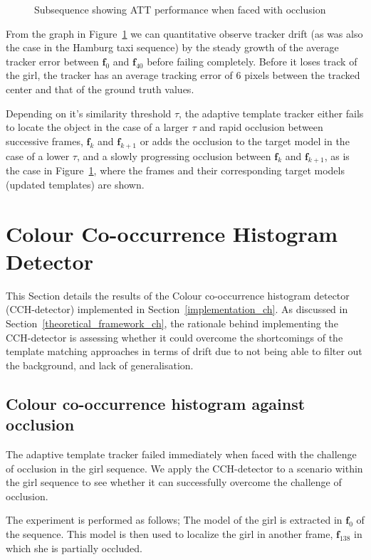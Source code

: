 \begin{figure}
{\begin{tabular}{cccc}
        \end{tabular}}
    \caption{Subsequence showing ATT performance when faced with occlusion\label{fig:adaptive_template_occlusion}}
\end{figure}

From the graph in Figure~\ref{fig:adaptive_template_occlusion} we can
quantitative observe tracker drift (as was also the case in the Hamburg taxi
sequence) by the steady growth of the average tracker error between
$\mathbf{f}_0$ and $\mathbf{f}_{40}$ before failing completely.
Before it loses track of the girl, the tracker has an average tracking error of
6 pixels between the tracked center and that of the ground truth values.

Depending on it's similarity threshold $\tau$, the adaptive template tracker
either fails to locate the object in the case of a larger $\tau$ and rapid
occlusion between successive frames, $\mathbf{f}_k$ and $\mathbf{f}_{k+1}$ or
adds the occlusion to the target model in the case of a lower $\tau$, and a
slowly progressing occlusion between $\mathbf{f}_k$ and $\mathbf{f}_{k+1}$, as
is the case in Figure~\ref{fig:adaptive_template_occlusion}, where the frames
and their corresponding target models (updated templates) are shown. 

\section{Colour Co-occurrence Histogram Detector}
This Section details the results of the Colour co-occurrence histogram detector
(CCH-detector) implemented in Section~\ref{implementation_ch}.
As discussed in Section~\ref{theoretical_framework_ch}, the rationale behind
implementing the CCH-detector is assessing whether it could overcome the
shortcomings of the template matching approaches in terms of drift due to not
being able to filter out the background, and lack of generalisation.

\subsection{Colour co-occurrence histogram against occlusion}
The adaptive template tracker failed immediately when faced with the challenge
of occlusion in the girl sequence. We apply the CCH-detector to a scenario within
the girl sequence to see whether it can successfully overcome the challenge of
occlusion.

The experiment is performed as follows; The model of the girl is extracted in
$\mathbf{f}_0$ of the sequence. This model is then used to localize
the girl in another frame, $\mathbf{f}_{138}$ in which she is partially
occluded.

